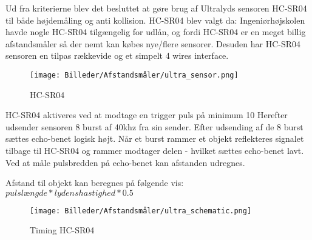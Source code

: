 \newpage

Ud fra kriterierne blev det besluttet at gøre brug af Ultralyds sensoren HC-SR04 til både højdemåling og anti kollision. HC-SR04 blev valgt da: Ingeniørhøjskolen havde nogle HC-SR04 tilgængelig for udlån, og fordi HC-SR04 er en meget billig afstandsmåler så der nemt kan købes nye/flere sensorer. Desuden har HC-SR04 sensoren en tilpas rækkevide og et simpelt 4 wires interface. 

\begin{figure}[H]
\centering
\texttt{[image: Billeder/Afstandsmåler/ultra\_sensor.png]}
\caption{HC-SR04}
\label{fig:HC-SR04}
\end{figure}

\vspace{1cm}

HC-SR04 aktiveres ved at modtage en trigger puls på minimum 10 
Herefter udsender sensoren 8 burst af 40khz fra sin sender. Efter udsending af de 8 burst sættes echo-benet logisk højt. Når et burst rammer et objekt reflekteres signalet tilbage til HC-SR04 og rammer modtager delen - hvilket sættes echo-benet lavt. Ved at måle pulsbredden på echo-benet kan afstanden udregnes. 

Afstand til objekt kan beregnes på følgende vis: $pulslængde * lydenshastighed * 0.5$

\vspace{0.1cm}

\begin{figure}[H]
\centering
\texttt{[image: Billeder/Afstandsmåler/ultra\_schematic.png]}
\caption{Timing HC-SR04}
\label{fig:HC-SR04}
\end{figure}











